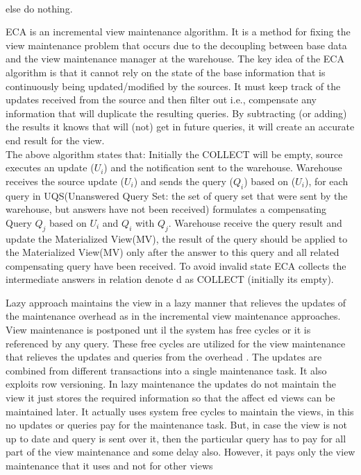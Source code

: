 \documentclass[12pt]{report}
\begin{document}
\begin{description}[font=$\bullet$~\normalfont\scshape\color{blue!50!black}]
\begin{center}
\\        else do nothing. 
\end{center}
ECA is an incremental view maintenance algorithm. It is a 
method   for   fixing   the   view   maintenance   problem   that   
occurs  due  to  the  decoupling  between  base  data  and  the  
view maintenance manager at the warehouse. The key idea 
of  the  ECA  algorithm  is  that  it  cannot  rely  on  the  state  of  
the     base     information     that     is     continuously     being     
updated/modified  by  the  sources.  It  must  keep  track  of  the  
updates  received  from  the  source  and  then  filter  out  i.e.,  
compensate any information that will duplicate the resulting 
queries. By subtracting (or adding) the results it knows that 
will (not) get in future queries, it will create an accurate end 
result for the view.
\\The above algorithm states that: 
Initially  the  COLLECT  will  be  empty,  source  executes  an  
update  ($U_i$)  and  the  notification  sent  to  the  warehouse.  
Warehouse  receives  the  source  update ($U_i$)  and  sends  the  
query ($Q_i$)     based on  ($U_i$), for each query in     
UQS(Unanswered Query Set: the set of query set that were 
sent by the warehouse, but answers have not been received)
formulates  a  compensating  Query $Q_j$ based on $U_i$ and $Q_i$ with $Q_j$. Warehouse receive the query result and update the 
Materialized  View(MV),  the  result  of  the  query  should  be  
applied to the Materialized View(MV) only after the answer 
to this query and all related compensating query have been 
received. 
To   avoid   invalid   state   ECA   collects   the   intermediate   
answers  in  relation  denote
d  as  COLLECT  (initially  its  
empty).\cite{saudi}
\item[Lazy Approach] Lazy approach maintains the view in a lazy manner that 
relieves the updates of the maintenance overhead as in the 
incremental view maintenance approaches. View 
maintenance is postponed unt
il the system has free cycles 
or it is referenced by any query. These free cycles are utilized for the view maintenance that relieves the updates 
and queries from the overhead
. The updates are combined 
from different transactions into a single maintenance task. It 
also exploits row versioning. In lazy maintenance the 
updates do not maintain the view it just stores the required 
information so that the affect
ed views can be maintained 
later. It actually uses system free cycles to maintain the 
views, in this no updates or queries pay for the maintenance 
task. But, in case the view is not
 up to date and query is sent 
over it, then the particular query has to pay for all part of 
the view maintenance and some
delay also. However, it 
pays only the view maintenance that it uses and not for 
other views \cite{basic}
\end{description}
\end{document}
